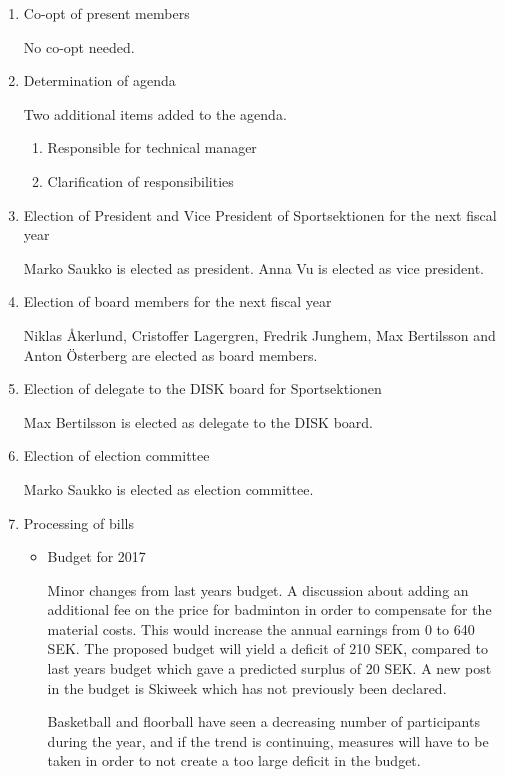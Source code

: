 \documentclass[12pt,a4paper]{article}
\begin{document}
\begin{enumerate}
		\item Co-opt of present members
		
			No co-opt needed.
			
		\item Determination of agenda
		
			Two additional items added to the agenda.
			\begin{enumerate}
				\item Responsible for technical manager
				\item Clarification of responsibilities
			\end{enumerate}
			
		\item Election of President and Vice President of Sportsektionen for the next fiscal year
		
			Marko Saukko is elected as president.
			Anna Vu is elected as vice president.
			
		\item Election of board members for the next fiscal year
		
			Niklas Åkerlund, Cristoffer Lagergren, Fredrik Junghem, Max Bertilsson and Anton Österberg are elected as board members.
			
		\item Election of delegate to the DISK board for Sportsektionen
		
			Max Bertilsson is elected as delegate to the DISK board.
			
		\item Election of election committee 
		
			Marko Saukko is elected as election committee.
			
		\item Processing of bills
			\begin{itemize}
				\item Budget for 2017
				
					Minor changes from last years budget. A discussion about adding an additional fee on the price for badminton in order to compensate for the material costs. This would increase the annual earnings from 0 to 640 SEK. The proposed budget will yield a deficit of 210 SEK, compared to last years budget which gave a predicted surplus of 20 SEK. A new post in the budget is Skiweek which has not previously been declared.
					
					Basketball and floorball have seen a decreasing number of participants during the year, and if the trend is continuing, measures will have to be taken in order to not create a too large deficit in the budget.


\end{itemize}
\end{enumerate}
\end{document}
